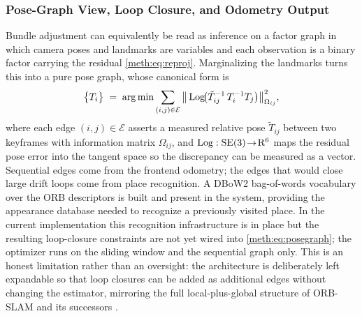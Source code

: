 \subsubsection{Pose-Graph View, Loop Closure, and Odometry Output}

Bundle adjustment can equivalently be read as inference on a factor graph in which camera poses and landmarks are variables and each observation is a binary factor carrying the residual \eqref{meth:eq:reproj}. Marginalizing the landmarks turns this into a pure pose graph, whose canonical form is
\begin{equation}
\big\{T_i\big\}
\;=\;
\operatorname*{arg\,min}
\sum_{(i,j)\in\mathcal{E}}
\big\lVert\,\mathrm{Log}\!\big(\tilde{T}_{ij}^{-1}\,T_i^{-1}T_j\big)\big\rVert^{2}_{\Omega_{ij}},
\label{meth:eq:posegraph}
\end{equation}
where each edge $(i,j)\in\mathcal{E}$ asserts a measured relative pose $\tilde{T}_{ij}$ between two keyframes with information matrix $\Omega_{ij}$, and $\mathrm{Log}:\mathrm{SE}(3)\!\to\!\mathrm{R}^{6}$ maps the residual pose error into the tangent space so the discrepancy can be measured as a vector. Sequential edges come from the frontend odometry; the edges that would close large drift loops come from place recognition. A DBoW2 bag-of-words vocabulary \cite{galvezlopez2012dbow2} over the ORB descriptors is built and present in the system, providing the appearance database needed to recognize a previously visited place. In the current implementation this recognition infrastructure is in place but the resulting loop-closure constraints are not yet wired into \eqref{meth:eq:posegraph}; the optimizer runs on the sliding window and the sequential graph only. This is an honest limitation rather than an oversight: the architecture is deliberately left expandable so that loop closures can be added as additional edges without changing the estimator, mirroring the full local-plus-global structure of ORB-SLAM and its successors \cite{murartal_2015_orbslam,campos_2021_orbslam3}.

